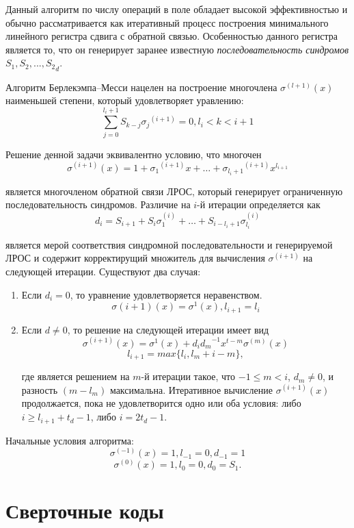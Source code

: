 Данный алгоритм по числу операций в поле обладает высокой эффективностью и обычно рассматривается как 
итеративный процесс построения минимального линейного регистра сдвига с обратной связью. Особенностью данного 
регистра является то, что он генерирует заранее известную \emph{последовательность синдромов} $S_1, S_2, 
..., {S_2}_d$.

Алгоритм Берлекэмпа–Месси нацелен на построение многочлена $\sigma^{(l+1)}(x)$ наименьшей степени, который
удовлетворяет уравлению: $$\sum \limits_{j=0}^{l_i+1}S_{k-j}{\sigma_j}^{(i+1)}=0, l_i<k<i+1$$

Решение денной задачи эквивалентно условию, что многочен
$$\sigma^{(i+1)}(x)=1+{\sigma_1}^{(i+1)}x+\ldots+{\sigma_{l_i+1}}^{(i+1)}x^{l_{i+1}}$$

является многочленом обратной связи ЛРОС, который генерирует ограниченную последовательность синдромов.
Различие на $i$-й итерации определяется как
$$d_i=S_{i+1}+S_i\sigma_1^{(i)}+\ldots+S_{i-l_i+1}\sigma_{l_i}^{(i)}$$

является мерой соответствия синдромной последовательности и генерируемой ЛРОС и содержит корректирущий
множитель для вычисления $\sigma^{(i+1)}$ на следующей итерации. Существуют два случая:
\begin{enumerate}
\item Если $d_i=0$, то уравнение удовлетворяется неравенством.
$$\sigma{(i+1)}(x)=\sigma^1(x), l_{i+1}=l_i$$

\item Если $d\ne0$, то решение на следующей итерации имеет вид
$$\sigma^{(i+1)}(x)=\sigma^1(x)+d_i {d_m}^{-1}x^{t-m}\sigma^{(m)}(x)$$
$$l_{i+1}=max\{l_i, l_m+i-m\},$$

где является решением на $m$-й итерации такое, что $-1\le m<i$, $d_m\ne 0$, и разность $(m-l_m)$ максимальна.
Итеративное вычисление $\sigma^{(i+1)}(x)$ продолжается, пока не удовлетворится одно или оба условия: либо
$i\ge l_{i+1}+t_d-1$, либо $i=2t_d-1$.
\end{enumerate}
 
Начальные условия алгоритма:
$$\sigma^{(-1)}(x)=1, l_{-1}=0, d_{-1}=1$$
$$\sigma^{(0)}(x)=1, l_0=0, d_{0}=S_1.$$


\section{Сверточные коды}

